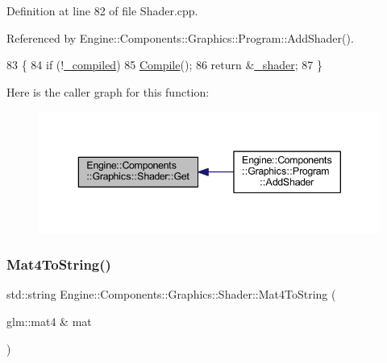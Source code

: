 Definition at line 82 of file Shader.\+cpp.



Referenced by Engine\+::\+Components\+::\+Graphics\+::\+Program\+::\+Add\+Shader().


\begin{DoxyCode}
83 \{
84     \textcolor{keywordflow}{if} (!\mbox{\hyperlink{classEngine_1_1Components_1_1Graphics_1_1Shader_a675c32a04d4eb33117d6ff2b988e13b5}{\_compiled}})
85         \mbox{\hyperlink{classEngine_1_1Components_1_1Graphics_1_1Shader_a348854b43d99bfe43e3d2b0cad5f103d}{Compile}}();
86     \textcolor{keywordflow}{return} &\mbox{\hyperlink{classEngine_1_1Components_1_1Graphics_1_1Shader_a4494d72a65715eb9f02e06a533684872}{\_shader}};
87 \}
\end{DoxyCode}
Here is the caller graph for this function\+:
\nopagebreak
\begin{figure}[H]
\begin{center}
\leavevmode
\includegraphics[width=343pt]{classEngine_1_1Components_1_1Graphics_1_1Shader_ad7c094ce0d42b3399e3533b3652a33fe_icgraph}
\end{center}
\end{figure}
\mbox{\label{classEngine_1_1Components_1_1Graphics_1_1Shader_a6d0f90b445c605f12eab980827b8d430}} 
\subsubsection{\texorpdfstring{Mat4\+To\+String()}{Mat4ToString()}}
{\footnotesize\ttfamily std\+::string Engine\+::\+Components\+::\+Graphics\+::\+Shader\+::\+Mat4\+To\+String (\begin{DoxyParamCaption}\item[{glm\+::mat4 \&}]{mat }\end{DoxyParamCaption})\hspace{0.3cm}{\ttfamily [private]}}



